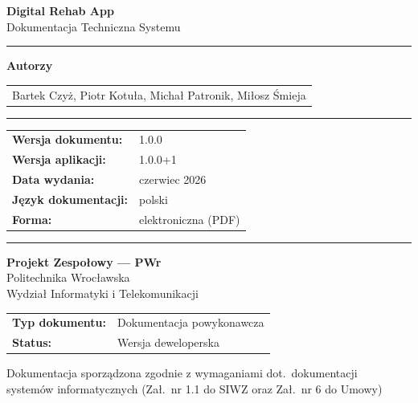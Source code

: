 \documentclass[12pt,a4paper]{article}
\begin{document}
\begin{titlepage}
  \centering
  \vspace*{2cm}
  {\Huge\bfseries Digital Rehab App\\[0.4em]}
  {\Large Dokumentacja Techniczna Systemu}
  \vspace{1.5cm}

  \rule{\linewidth}{0.5pt}
  \vspace{0.8cm}

  {\large\bfseries Autorzy}\\[0.6em]
  \begin{tabular}{c}
    Bartek Czyż,
    Piotr Kotuła, 
    Michał Patronik,
    Miłosz Śmieja 
  \end{tabular}

  \vspace{0.8cm}
  \rule{\linewidth}{0.5pt}
  \vspace{0.5cm}

  \begin{tabular}{ll}
    \textbf{Wersja dokumentu:}   & 1.0.0 \\[4pt]
    \textbf{Wersja aplikacji:}   & 1.0.0+1 \\[4pt]
    \textbf{Data wydania:}       & czerwiec 2026 \\[4pt]
    \textbf{Język dokumentacji:} & polski \\[4pt]
    \textbf{Forma:}              & elektroniczna (PDF) \\
  \end{tabular}

  \vspace{1cm}
  \rule{\linewidth}{0.5pt}
  \vspace{1cm}

  {\large\bfseries Projekt Zespołowy --- PWr}\\[0.6em]
  {\large Politechnika Wrocławska}\\
  {\large Wydział Informatyki i Telekomunikacji}

  \vspace{2cm}
  \begin{tabular}{ll}
    \textbf{Typ dokumentu:} & Dokumentacja powykonawcza \\[4pt]
    \textbf{Status:}        & Wersja deweloperska \\
  \end{tabular}

  \vfill
  {\small Dokumentacja sporządzona zgodnie z wymaganiami dot.\ dokumentacji\\
  systemów informatycznych (Zał.\ nr 1.1 do SIWZ oraz Zał.\ nr 6 do Umowy)}
\end{titlepage}
\end{document}
